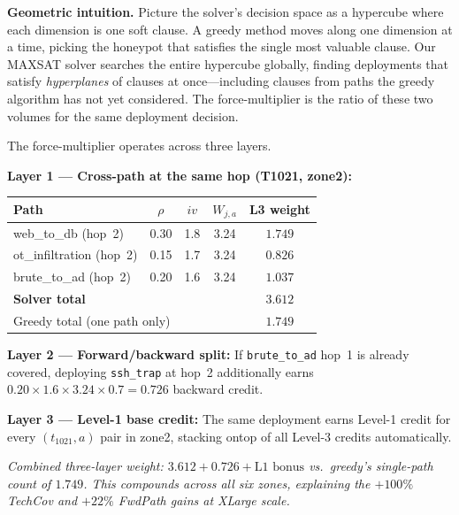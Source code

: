 \documentclass[journal]{IEEEtran}
\begin{document}
\begin{insightbox}
\textbf{Geometric intuition.}
Picture the solver's decision space as a hypercube where
each dimension is one soft clause.
A greedy method moves along one dimension at a time,
picking the honeypot that satisfies the single most valuable
clause.
Our MAXSAT solver searches the entire hypercube globally,
finding deployments that satisfy \emph{hyperplanes} of
clauses at once---including clauses from paths the greedy
algorithm has not yet considered.
The force-multiplier is the ratio of these two volumes for
the same deployment decision.
\end{insightbox}

The force-multiplier operates across three layers.

\begin{examplebox}
\textbf{Layer 1 --- Cross-path at the same hop (T1021, zone2):}
\begin{center}
\small
\renewcommand{\arraystretch}{1.15}
\begin{tabular}{@{}lcccc@{}}
\toprule
\textbf{Path} & $\rho$ & $iv$ & $W_{j,a}$ & \textbf{L3 weight}\\
\midrule
web\_to\_db (hop~2)     & 0.30 & 1.8 & 3.24 & $\mathbf{1.749}$ \\
ot\_infiltration (hop~2)& 0.15 & 1.7 & 3.24 & $\mathbf{0.826}$ \\
brute\_to\_ad (hop~2)   & 0.20 & 1.6 & 3.24 & $\mathbf{1.037}$ \\
\midrule
\multicolumn{4}{l}{\textbf{Solver total}} & $\mathbf{3.612}$ \\
\multicolumn{4}{l}{Greedy total (one path only)} & $1.749$ \\
\bottomrule
\end{tabular}
\end{center}

\textbf{Layer 2 --- Forward/backward split:}
If \texttt{brute\_to\_ad} hop~1 is already covered,
deploying \texttt{ssh\_trap} at hop~2 additionally earns
$0.20\!\times\!1.6\!\times\!3.24\!\times\!0.7 = \mathbf{0.726}$
backward credit.

\textbf{Layer 3 --- Level-1 base credit:}
The same deployment earns Level-1 credit for every
$(t_{1021}, a)$ pair in zone2, stacking ontop of all
Level-3 credits automatically.

\textit{Combined three-layer weight: $3.612 + 0.726 + \text{L1~bonus}$
vs.\ greedy's single-path count of $1.749$.
This compounds across all six zones, explaining the $+100\%$
TechCov and $+22\%$ FwdPath gains at XLarge scale.}
\end{examplebox}
\end{document}
